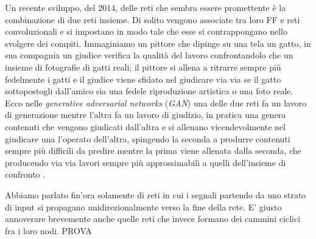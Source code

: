 Un recente sviluppo, del 2014, delle reti che sembra essere promettente è la combinazione di due reti insieme. Di solito vengono associate tra loro FF e reti convoluzionali e si impostano in modo tale che esse si contrappongano nello svolgere dei compiti. Immaginiamo un pittore che dipinge su una tela un gatto, in sua compagnia un giudice verifica la qualità del lavoro confrontandolo che un insieme di fotografie di gatti reali; il pittore si allena a ritrarre sempre più fedelmente i gatti e il giudice viene sfidato nel giudicare via via se il gatto sottopostogli dall'amico sia una fedele riproduzione artistica o una foto reale. Ecco nelle \emph{generative adversarial networks} (\textit{GAN}) una delle due reti fa un lavoro di generazione mentre l'altra fa un lavoro di giudizio, in pratica una genera contenuti che vengono giudicati dall'altra e si allenano vicendevolmente nel giudicare una l'operato dell'altra, spingendo la seconda a produrre contenuti sempre più difficili da predire mentre la prima viene allenata dalla seconda, che producendo via via lavori sempre più approssimabili a quelli dell'insieme di confronto \cite{goodfellow2014generative}.

Abbiamo parlato fin'ora solamente di reti in cui i segnali partendo da uno strato di input si propagano unidirezionalmente verso la fine della rete. E' giusto annoverare brevemente anche quelle reti che invece formano dei cammini ciclici fra i loro nodi.
PROVA